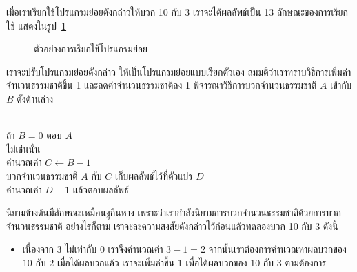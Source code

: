 เมื่อ{\wbr}เรา{\wbr}เรียก{\wbr}ใช้{\wbr}โปรแกรมย่อย{\wbr}ดังกล่าว{\wbr}ให้{\wbr}บวก 10 กับ 3 เรา{\wbr}จะ{\wbr}ได้{\wbr}ผลลัพธ์{\wbr}เป็น 13
ลักษณะ{\wbr}ของ{\wbr}การ{\wbr}เรียก{\wbr}ใช้ แสดง{\wbr}ใน{\wbr}รูป~\ref{rec:add-call}

\begin{figure}
\begin{center}
\end{center}
\caption{ตัวอย่าง{\wbr}การ{\wbr}เรียก{\wbr}ใช้{\wbr}โปรแกรมย่อย}
\label{rec:add-call}
\end{figure}

เรา{\wbr}จะ{\wbr}ปรับ{\wbr}โปรแกรมย่อย{\wbr}ดังกล่าว ให้{\wbr}เป็น{\wbr}โปรแกรมย่อย{\wbr}แบบ{\wbr}เรียก{\wbr}ตัวเอง{\wbr}
สมมติ{\wbr}ว่า{\wbr}เรา{\wbr}ทราบ{\wbr}วิธีการ{\wbr}เพิ่ม{\wbr}ค่า{\wbr}จำนวน{\wbr}ธรรมชาติ{\wbr}ขึ้น 1 และ{\wbr}ลด{\wbr}ค่า{\wbr}จำนวน{\wbr}ธรรมชาติ{\wbr}ลง 1
พิจารณา{\wbr}วิธีการ{\wbr}บวก{\wbr}จำนวน{\wbr}ธรรมชาติ $A$ เข้า{\wbr}กับ $B$ ดัง{\wbr}ด้าน{\wbr}ล่าง{\wbr}

\begin{algt}
\\
\hspace*{0.2in} ถ้า $B=0$ ตอบ $A$\\
\hspace*{0.2in} ไม่{\wbr}เช่นนั้น \\
\hspace*{0.2in}\hspace*{0.2in} คำนวณ{\wbr}ค่า $C\leftarrow B-1$\\
\hspace*{0.2in}\hspace*{0.2in} บวก{\wbr}จำนวน{\wbr}ธรรมชาติ $A$ กับ $C$ เก็บ{\wbr}ผลลัพธ์{\wbr}ไว้{\wbr}ที่{\wbr}ตัวแปร $D$\\
\hspace*{0.2in}\hspace*{0.2in} คำนวณ{\wbr}ค่า $D+1$ แล้ว{\wbr}ตอบ{\wbr}ผลลัพธ์{\wbr}
\end{algt}

นิยาม{\wbr}ข้างต้น{\wbr}มี{\wbr}ลักษณะ{\wbr}เหมือน{\wbr}งู{\wbr}กิน{\wbr}หาง{\wbr}
เพราะว่า{\wbr}เรา{\wbr}กำลัง{\wbr}นิยาม{\wbr}การ{\wbr}บวก{\wbr}จำนวน{\wbr}ธรรมชาติ{\wbr}ด้วย{\wbr}การ{\wbr}บวก{\wbr}จำนวน{\wbr}ธรรมชาติ อย่างไรก็ตาม{\wbr}
เรา{\wbr}จะ{\wbr}ละ{\wbr}ความ{\wbr}สงสัย{\wbr}ดังกล่าว{\wbr}ไว้{\wbr}ก่อน{\wbr}แล้ว{\wbr}ทดลอง{\wbr}บวก 10 กับ 3 ดังนี้{\wbr}

\begin{itemize}
\item เนื่องจาก $3$ ไม่{\wbr}เท่า{\wbr}กับ $0$ เรา{\wbr}จึง{\wbr}คำนวณ{\wbr}ค่า $3-1 = 2$
จากนั้น{\wbr}เรา{\wbr}ต้องการ{\wbr}คำนวณ{\wbr}หา{\wbr}ผลบวก{\wbr}ของ $10$ กับ $2$ เมื่อ{\wbr}ได้{\wbr}ผลบวก{\wbr}แล้ว เรา{\wbr}จะ{\wbr}เพิ่ม{\wbr}ค่า{\wbr}ขึ้น{\wbr}
$1$ เพื่อ{\wbr}ได้{\wbr}ผลบวก{\wbr}ของ $10$ กับ $3$ ตาม{\wbr}ต้องการ{\wbr}
\end{itemize}

